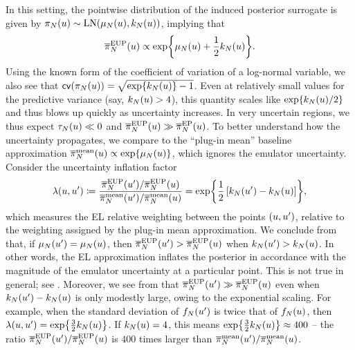 \documentclass[12pt]{article}
\begin{document}
In this setting, the pointwise distribution of the induced posterior surrogate is given by
$\pi_{N}(u) \sim \mathrm{LN}(\mu_{N}(u), k_{N}(u))$, implying that
\begin{equation}
\overline{\pi}_{N}^{\mathrm{EUP}}(u) \propto \exp\mathopen{}\left\{\mu_{N}(u) + \frac{1}{2}k_{N}(u)\right\}\mathclose{}.
\label{eq:EL-Gaussian-fwd}
\end{equation} 
Using the known form of the coefficient of variation of a log-normal variable, we also see that
$\mathsf{cv}(\pi_{N}(u)) = \sqrt{\exp\mathopen{}\left\{k_{N}(u)\right\}\mathclose{} - 1}$. Even at relatively small values for the 
predictive variance (say, $k_{N}(u) > 4$), this quantity scales like $\exp\mathopen{}\left\{k_{N}(u)/2\right\}\mathclose{}$
and thus blows up quickly as uncertainty increases. In very uncertain regions, we thus expect
$\tau_{N}(u) \ll 0$ and $\overline{\pi}_{N}^{\mathrm{EUP}}(u) \gg \overline{\pi}_{N}^{\mathrm{EP}}(u)$.
To better understand how the uncertainty propagates, we compare to the ``plug-in mean''
 baseline approximation $\overline{\pi}_{N}^{\mathrm{mean}}(u) \propto \exp\mathopen{}\left\{\mu_{N}(u)\right\}\mathclose{}$, 
 which ignores the emulator uncertainty. Consider the uncertainty inflation factor
 \begin{equation}
 \lambda(u, u^\prime) 
 \coloneqq \frac{\overline{\pi}_{N}^{\mathrm{EUP}}(u^\prime)/\overline{\pi}_{N}^{\mathrm{EUP}}(u)}{\overline{\pi}_{N}^{\mathrm{mean}}(u^\prime)/\overline{\pi}_{N}^{\mathrm{mean}}(u)}
 = \exp\mathopen{}\left\{\frac{1}{2}\left[k_{N}(u^\prime) - k_{N}(u) \right]\right\}\mathclose{},
 \label{eq:unc-infl-factor}
 \end{equation}
which measures the EL relative weighting between the points $(u, u^\prime)$, relative to the 
weighting assigned by the plug-in mean approximation. We conclude from 
that, if $\mu_{N}(u^\prime) = \mu_{N}(u)$, then $\overline{\pi}_{N}^{\mathrm{EUP}}(u^\prime) > \overline{\pi}_{N}^{\mathrm{EUP}}(u)$
when $k_{N}(u^\prime) > k_{N}(u)$. In other words, the EL approximation inflates the posterior
in accordance with the magnitude of the emulator uncertainty at a particular point. 
This is not true in general; see . Moreover, we see from  that
$\overline{\pi}_{N}^{\mathrm{EUP}}(u^\prime) \gg \overline{\pi}_{N}^{\mathrm{EUP}}(u)$ even when 
$k_{N}(u^\prime) - k_{N}(u)$ is only modestly large, owing to the exponential scaling. 
For example, when the standard deviation of $f_{N}(u^\prime)$ is twice that of $f_{N}(u)$,
then $\lambda(u, u^\prime) = \exp\mathopen{}\left\{\frac{3}{2}k_{N}(u)\right\}\mathclose{}$. If $k_{N}(u) = 4$, this means
$\exp\mathopen{}\left\{\frac{3}{2}k_{N}(u)\right\}\mathclose{} \approx 400$ -- the ratio $\overline{\pi}_{N}^{\mathrm{EUP}}(u^\prime)/\overline{\pi}_{N}^{\mathrm{EUP}}(u)$
is $400$ times larger than $\overline{\pi}_{N}^{\mathrm{mean}}(u^\prime)/\overline{\pi}_{N}^{\mathrm{mean}}(u)$.
\end{document}
